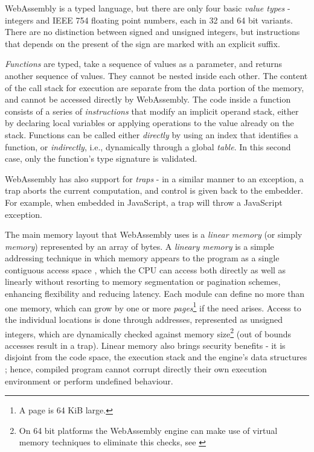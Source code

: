 
WebAssembly is a typed language, but there are only four basic \textit{value types} - integers and IEEE 754 floating
point numbers, each in 32 and 64 bit variants. There are no distinction between signed and unsigned integers,
but instructions that depends on the present of the sign are marked with an explicit suffix.

\textit{Functions} are typed, take a sequence of values as a parameter, and returns another sequence of values.
They cannot be nested inside each other. The content of the call stack for execution are separate from the data
portion of the memory, and cannot be accessed directly by WebAssembly.
The code inside a function consists of a series of \textit{instructions} that modify an implicit operand stack,
either by declaring local variables or applying operations to the value already on the stack.
Functions can be called either \textit{directly} by using an index that identifies a function, or \textit{indirectly},
i.e., dynamically through a global \textit{table}. In this second case, only the function's type signature is validated.

WebAssembly has also support for \textit{traps} - in a similar manner to an exception, a trap aborts the current
computation, and control is given back to the embedder. For example, when embedded in JavaScript, a trap will
throw a JavaScript exception.

The main memory layout that WebAssembly uses is a \textit{linear memory} (or simply \textit{memory}) represented
by an array of bytes. A \textit{lineary memory} is a simple addressing technique in which memory appears to the
program as a single contiguous access space \cite{processor-microarchitecture}, which the CPU can access both directly as well as linearly
without resorting to memory segmentation or pagination schemes, enhancing flexibility and reducing latency.
Each module can define no more than one memory, which can grow by one or more
\textit{pages}\footnote{A page is 64 KiB large.} if the need arises.
Access to the individual locations is done through addresses, represented as unsigned integers,
which are dynamically checked against memory size\footnote{On 64 bit platforms the WebAssembly engine
can make use of virtual memory techniques to eliminate this checks, see \cite{bringing-the-web-up-to-speed-2017}}
(out of bounds accesses result in a trap).
Linear memory also brings security benefits - it is disjoint from the code space, the execution stack and the engine's
data structures \cite{bringing-the-web-up-to-speed-2017}; hence, compiled program cannot corrupt directly their own execution
environment or perform undefined behaviour.

